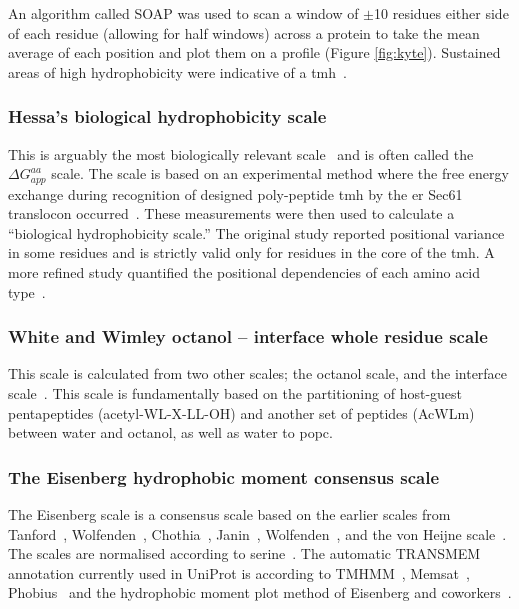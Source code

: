 An algorithm called SOAP was used to scan a window of $\pm$10 residues either side of each residue (allowing for half windows) across a protein to take the mean average of each position and plot them on a profile (Figure \ref{fig:kyte}).
Sustained areas of high hydrophobicity were indicative of a \gls{tmh}~\cite{Kyte1982}.

\subsubsection{Hessa's biological hydrophobicity scale}
This is arguably the most biologically relevant scale~\cite{Peters2014} and is often called the ${\Delta G}_{app}^{aa}$ scale.
The scale is based on an experimental method where the free energy exchange during recognition of designed poly-peptide \gls{tmh} by the \gls{er} Sec61 translocon occurred~\cite{Hessa2005}.
These measurements were then used to calculate a “biological hydrophobicity scale.” The original study reported positional variance in some residues and is strictly valid only for residues in the core of the \gls{tmh}.
A more refined study quantified the positional dependencies of each amino acid type~\cite{Hessa2007}.

\subsubsection{White and Wimley octanol \--- interface whole residue scale}
This scale is calculated from two other scales; the octanol scale, and the interface scale~\cite{White1999}.
This scale is fundamentally based on the partitioning of host-guest pentapeptides (acetyl-WL-X-LL-OH) and another set of peptides (AcWLm) between water and octanol, as well as water to \gls{popc}.

\subsubsection{The Eisenberg hydrophobic moment consensus scale}
The Eisenberg scale is a consensus scale based on the earlier scales from Tanford~\cite{Nozaki1971}, Wolfenden~\cite{Rose1993}, Chothia~\cite{Chothia1976}, Janin~\cite{Janin1979},  Wolfenden~\cite{Wolfenden1981}, and the von Heijne scale~\cite{VonHeijne1979}.
The scales are normalised according to serine~\cite{Eisenberg1984}.
The automatic TRANSMEM annotation currently used in UniProt is according to TMHMM~\cite{Krogh2001}, Memsat~\cite{Jones2007}, Phobius~\cite{Kall2004} and the hydrophobic moment plot method of Eisenberg and coworkers~\cite{Eisenberg1984}.

